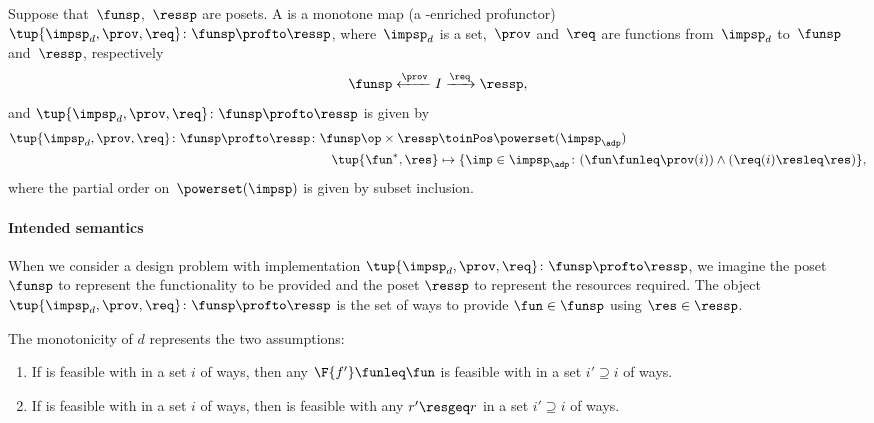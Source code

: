 \begin{definition}
    \label{def:dpwithimp}
    Suppose that~$\funsp$,~$\ressp$ are posets. A \emph{} is a monotone map (a \Set-enriched profunctor)~$\tup{\impsp_d,\prov,\req}\colon \funsp\profto \ressp$, where~$\impsp_d$ is a set,~$\prov$ and~$\req$ are functions from~$\impsp_d$ to~$\funsp$ and~$\ressp$, respectively
    \begin{equation}
        \funsp \xleftarrow{\prov} I \xrightarrow{\req} \ressp,
    \end{equation}
    and $\tup{\impsp_d,\prov,\req}\colon \funsp\profto \ressp$ is given by
    \begin{equation}
        \begin{aligned}
            \tup{\impsp_d,\prov,\req}\colon \funsp\profto \ressp \colon \funsp\op \times \ressp &\toinPos \powerset(\impsp_\adp) \\
            \tup{\fun^*, \res} &\mapsto \{ \imp \in \impsp_\adp \colon ( \fun \funleq \prov(i)) \wedge (\req(i) \resleq \res) \},
        \end{aligned}
    \end{equation}
    where the partial order on~$\powerset(\impsp)$ is given by subset inclusion.
\end{definition}

\paragraph{Intended semantics} When we consider a design problem with implementation $\tup{\impsp_d, \prov, \req}\colon \funsp\profto \ressp$, we imagine the poset $\funsp$ to represent the functionality to be provided and the poset $\ressp$ to represent the resources required. The object $\tup{\impsp_d,\prov,\req}\colon \funsp\profto \ressp$ is the set of ways to provide $\fun\in \funsp$ using $\res\in \ressp$.

\noindent The monotonicity of $d$ represents the two assumptions:
\begin{enumerate}
    \item If \fun is feasible with \res in a set $i$ of ways, then any $\F{f'}\funleq \fun$ is feasible with \res in a set $i'\supseteq i$ of ways.
    \item If \fun is feasible with \res in a set $i$ of ways, then \fun is feasible with any $r'\resgeq r$ in a set $i'\supseteq i$ of ways.
\end{enumerate}

